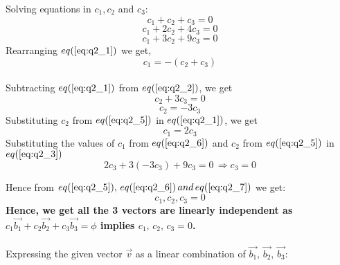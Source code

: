 \documentclass{article}
\begin{document}
Solving equations in $c_1, c_2$ and $c_3$:
\begin{equation} \label{eq:q2_1}
	c_1 + c_2 + c_3 = 0
\end{equation}
\begin{equation} \label{eq:q2_2}
	c_1 + 2 c_2 + 4 c_3 = 0
\end{equation}
\begin{equation} \label{eq:q2_3}
	c_1 + 3 c_2 + 9 c_3 = 0
\end{equation}
Rearranging $eq(\ref{eq:q2_1})$ we get, \\
\begin{equation} \label{eq:q2_4}
	c_1 = -(c_2 + c_3)
\end{equation}\\ 
Subtracting $eq(\ref{eq:q2_1})$ from $eq(\ref{eq:q2_2})$, we get
\begin{equation}
	c_2 + 3c_3 = 0
\end{equation}
\begin{equation} \label{eq:q2_5}
	c_2 = -3c_3 
\end{equation}
Substituting $c_2$ from $eq(\ref{eq:q2_5})$ in $eq(\ref{eq:q2_1})$, we get \\
\begin{equation} \label{eq:q2_6}
	c_1 = 2c_3
\end{equation}
Substituting the values of $c_1$ from $eq(\ref{eq:q2_6})$ and $c_2$ from $eq(\ref{eq:q2_5})$ in $eq(\ref{eq:q2_3})$
\begin{equation} \label{eq:q2_7}
	2c_3 + 3(-3c_3) + 9c_3 = 0 \, \Longrightarrow c_3 = 0
\end{equation} 

Hence from $eq(\ref{eq:q2_5}), \, eq(\ref{eq:q2_6}) \, and \, eq(\ref{eq:q2_7})$ we get:	
\[c_1, c_2, c_3 = 0\]
\textbf{Hence, we get all the 3 vectors are linearly independent as $ c_1 \vec{b_1} + c_2 \vec{b_2} + c_3 \vec{b_3} = \phi$ implies $c_1, \, c_2, \, c_3 = 0  $.}\\
\\
Expressing the given vector $\vec{v}$ as a linear combination of $\vec{b_1}, \, \vec{b_2}, \, \vec{b_3}$: \\
\end{document}
